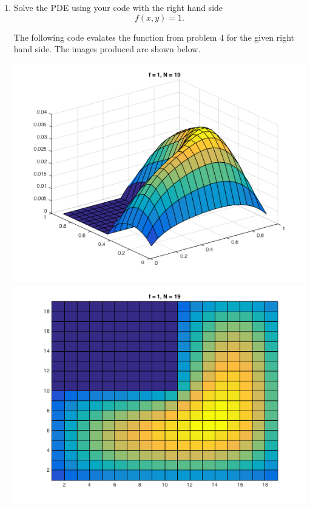\documentclass[11pt, oneside, titlepage]{article}
\begin{document}
\begin{enumerate}
    \item %
        Solve the PDE using your code with the right hand side
        \[
            f(x, y) = 1.
        \]

        The following code evalates the function from problem 4 for the
        given right hand side.
        The images produced are shown below.
        
        \begin{center}
            \includegraphics[scale=.5]{Figures/03_6_1.png}
            \includegraphics[scale=.5]{Figures/03_6_2.png}

\end{center}
\end{enumerate}
\end{document}
